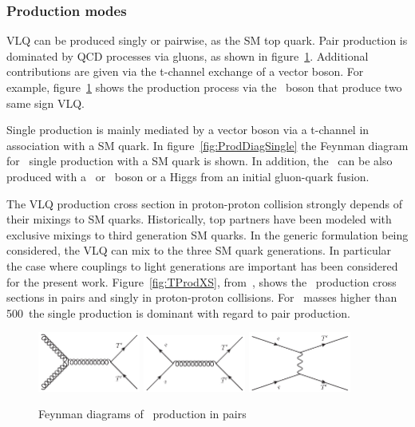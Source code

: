 \subsubsection{Production modes}
\label{sec:prod}

VLQ can be produced singly or pairwise, as the SM top quark. Pair production is dominated by QCD processes via gluons, as shown in figure~\ref{fig:ProdDiagPair}. Additional contributions are given via the t-channel exchange of a vector boson. For example, figure~\ref{fig:ProdDiagPair} shows the production process via the \Z~boson that produce two same sign VLQ.   

Single production is mainly mediated by a vector boson via a t-channel in association with a SM quark. In figure~\ref{fig:ProdDiagSingle} the Feynman diagram for \Tp~single production with a SM quark is shown. In addition, the \Tp~can be also produced with a \Z~or \W~boson or a Higgs from an initial gluon-quark fusion. 

The VLQ production cross section in proton-proton collision strongly depends of their mixings to SM quarks. Historically, top partners have been modeled with exclusive mixings to third generation SM quarks. In the generic formulation being considered, the VLQ can mix to the three SM quark generations. In particular the case where couplings to light generations are important has been considered for the present work. Figure~\ref{fig:TProdXS}, from~\cite{Cacciapaglia:2011fx}, shows the \Tp~production cross sections in pairs and singly in proton-proton collisions. For \Tp~masses higher than 500~\GeVcc the single production is dominant with regard to pair production. 

\begin{figure}[!Hhtbp]
  \begin{center}
    \includegraphics[width=0.3\textwidth]{figs/Gluon_fusion_T_pair.jpg}
    \includegraphics[width=0.3\textwidth]{figs/Quarks_schannel_T_pair.jpg}
    \includegraphics[width=0.3\textwidth]{figs/Gluon_tchannel_T_pair.jpg}
    \caption{Feynman diagrams of \Tp~production in pairs}
    \label{fig:ProdDiagPair}
  \end{center}
\end{figure}

